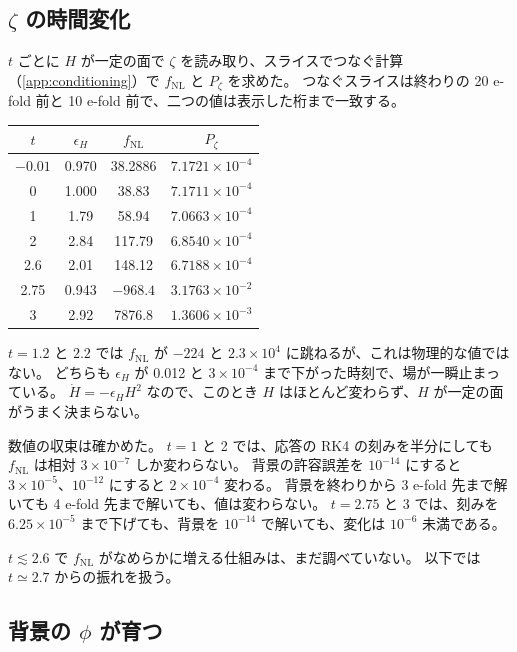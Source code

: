 \documentclass[a4paper,11pt]{ltjsarticle}
\newcommand{\fnl}{f_{\mathrm{NL}}}
\begin{document}
\subsection{\texorpdfstring{$\zeta$}{ζ} の時間変化}

$t$ ごとに $H$ が一定の面で $\zeta$ を読み取り、スライスでつなぐ計算（\ref{app:conditioning}）で $\fnl$ と $P_\zeta$ を求めた。
つなぐスライスは終わりの 20 e-fold 前と 10 e-fold 前で、二つの値は表示した桁まで一致する。
\begin{center}
\begin{tabular}{cccc}
\toprule
$t$ & $\epsilon_H$ & $\fnl$ & $P_\zeta$ \\
\midrule
$-0.01$ & 0.970 & 38.2886 & $7.1721\times10^{-4}$ \\
0 & 1.000 & 38.83 & $7.1711\times10^{-4}$ \\
1 & 1.79 & 58.94 & $7.0663\times10^{-4}$ \\
2 & 2.84 & 117.79 & $6.8540\times10^{-4}$ \\
2.6 & 2.01 & 148.12 & $6.7188\times10^{-4}$ \\
2.75 & 0.943 & $-968.4$ & $3.1763\times10^{-2}$ \\
3 & 2.92 & 7876.8 & $1.3606\times10^{-3}$ \\
\bottomrule
\end{tabular}
\end{center}

$t=1.2$ と $2.2$ では $\fnl$ が $-224$ と $2.3\times10^4$ に跳ねるが、これは物理的な値ではない。
どちらも $\epsilon_H$ が 0.012 と $3\times10^{-4}$ まで下がった時刻で、場が一瞬止まっている。
$\dot H=-\epsilon_H H^2$ なので、このとき $H$ はほとんど変わらず、$H$ が一定の面がうまく決まらない。

数値の収束は確かめた。
$t=1$ と 2 では、応答の RK4 の刻みを半分にしても $\fnl$ は相対 $3\times10^{-7}$ しか変わらない。
背景の許容誤差を $10^{-14}$ にすると $3\times10^{-5}$、$10^{-12}$ にすると $2\times10^{-4}$ 変わる。
背景を終わりから 3 e-fold 先まで解いても 4 e-fold 先まで解いても、値は変わらない。
$t=2.75$ と 3 では、刻みを $6.25\times10^{-5}$ まで下げても、背景を $10^{-14}$ で解いても、変化は $10^{-6}$ 未満である。

$t\lesssim2.6$ で $\fnl$ がなめらかに増える仕組みは、まだ調べていない。
以下では $t\simeq2.7$ からの振れを扱う。

\subsection{背景の \texorpdfstring{$\phi$}{φ} が育つ}
\end{document}
